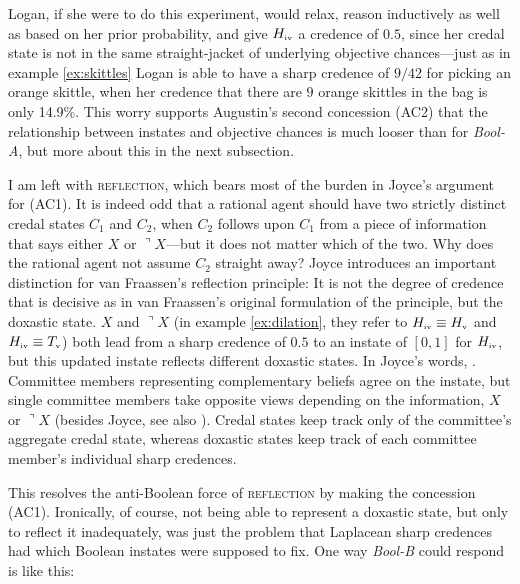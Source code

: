 \documentclass[11pt]{article}
\newcommand{\anderson}[0]{\textit{Bool-A}}
\newcommand{\augustin}[0]{\textit{Bool-B}}
\begin{document}
Logan, if she were to do this experiment, would relax, reason
inductively as well as based on her prior probability, and give
$H_{\mbox{\tiny{iv}}}$ a credence of $0.5$, since her credal state is
not in the same straight-jacket of underlying objective chances---just
as in example \ref{ex:skittles} Logan is able to have a sharp credence
of $9/42$ for picking an orange skittle, when her credence that there
are $9$ orange skittles in the bag is only 14.9\%. This worry supports
Augustin's second concession (AC2) that the relationship between
instates and objective chances is much looser than for {\anderson},
but more about this in the next subsection.

I am left with \textsc{reflection}, which bears most of the burden in
Joyce's argument for (AC1). It is indeed odd that a rational agent
should have two strictly distinct credal states $C_{1}$ and $C_{2}$,
when $C_{2}$ follows upon $C_{1}$ from a piece of information that
says either $X$ or $\urcorner{}X$---but it does not matter which of
the two. Why does the rational agent not assume $C_{2}$ straight away?
Joyce introduces an important distinction for van Fraassen's
reflection principle: It is not the degree of credence that is
decisive as in van Fraassen's original formulation of the principle,
but the doxastic state. $X$ and $\urcorner{}X$ (in example
\ref{ex:dilation}, they refer to
$H_{\mbox{\tiny{iv}}}\equiv{}H_{\mbox{\tiny{v}}}$ and
$H_{\mbox{\tiny{iv}}}\equiv{}T_{\mbox{\tiny{v}}}$) both lead from a
sharp credence of $0.5$ to an instate of $[0,1]$ for
$H_{\mbox{\tiny{iv}}}$, but this updated instate reflects different
doxastic states. In Joyce's words, 
. Committee members representing complementary
beliefs agree on the instate, but single committee members take
opposite views depending on the information, $X$ or $\urcorner{}X$
(besides Joyce, see also ). Credal
states keep track only of the committee's aggregate credal state,
whereas doxastic states keep track of each committee member's
individual sharp credences.

This resolves the anti-Boolean force of \textsc{reflection} by making
the concession (AC1). Ironically, of course, not being able to
represent a doxastic state, but only to reflect it inadequately, was
just the problem that Laplacean sharp credences had which Boolean
instates were supposed to fix. One way {\augustin} could respond is
like this:
\end{document}
